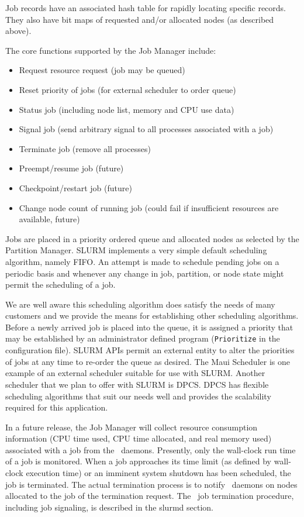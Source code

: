 Job records have an associated hash table for rapidly locating 
specific records. They also have bit maps of requested and/or 
allocated nodes (as described above).

The core functions supported by the Job Manager include:
\begin{itemize}
\item Request resource request (job may be queued)
\item Reset priority of jobs (for external scheduler to order queue)
\item Status job (including node list, memory and CPU use data)
\item Signal job (send arbitrary signal to all processes associated 
with a job)
\item Terminate job (remove all processes)
\item Preempt/resume job  (future)
\item Checkpoint/restart job (future)
\item Change node count of running job (could fail if insufficient 
resources are available, future)
\end{itemize}

Jobs are placed in a priority ordered queue and allocated nodes as 
selected by the Partition Manager. 
SLURM implements a very simple default scheduling algorithm, namely FIFO. 
An attempt is made to schedule pending jobs on a periodic basis
and whenever any change in job, partition, or node state might permit
the scheduling of a job.  

We are well aware this scheduling algorithm does satisfy the needs of many
customers and we provide the means for establishing other scheduling
algorithms. Before a newly arrived job is placed into the queue, it
is assigned a priority that may be established by an administrator
defined program ({\tt Prioritize} in the configuration file). 
SLURM APIs permit an external entity to alter the
priorities of jobs at any time to re-order the queue as desired.
The Maui Scheduler\cite{Jackson2001,Maui2002}
is one example of an external scheduler suitable for use with SLURM.
Another scheduler that we plan to offer with SLURM is
DPCS\cite{DPCS2002}.  
DPCS has flexible scheduling algorithms that suit our needs well and 
provides the scalability required for this application.

In a future release, the Job Manager will collect resource consumption 
information (CPU time used, CPU time allocated, and real memory used) 
associated with a job from the \slurmd\ daemons.  
Presently, only the wall-clock run time of a job is monitored.
When a job approaches its time limit (as defined by wall-clock 
execution time) or an imminent system shutdown has been scheduled, 
the job is terminated.  
The actual termination process is to notify \slurmd\ daemons on nodes 
allocated to the job of the termination request. 
The \slurmd\ job termination procedure, including job
signaling, is described in the slurmd section.

